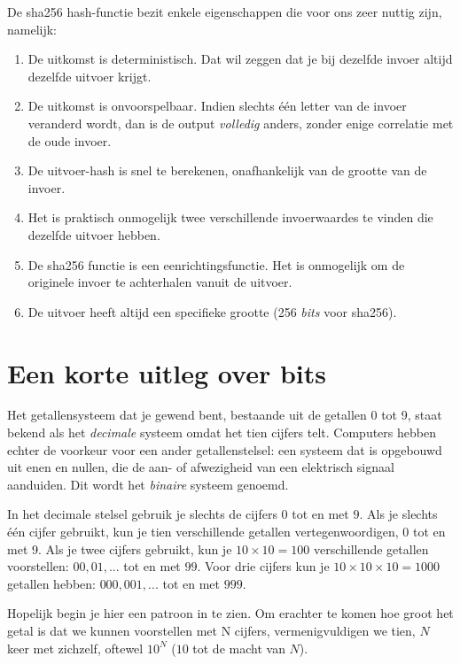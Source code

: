 \clearpage

De sha256 hash-functie bezit enkele eigenschappen die voor ons zeer nuttig zijn, namelijk:



\begin{enumerate}
    \item De uitkomst is deterministisch. Dat wil zeggen dat je bij dezelfde invoer altijd dezelfde uitvoer krijgt.
    \item De uitkomst is onvoorspelbaar. Indien slechts één letter van de invoer veranderd wordt, dan is de output \textit{volledig} anders, zonder enige correlatie met de oude invoer.
    \item De uitvoer-hash is snel te berekenen, onafhankelijk van de grootte van de invoer.
    \item Het is praktisch onmogelijk twee verschillende invoerwaardes te vinden die dezelfde uitvoer hebben.
    \item De sha256 functie is een eenrichtingsfunctie. Het is onmogelijk om de originele invoer te achterhalen vanuit de uitvoer.
    \item De uitvoer heeft altijd een specifieke grootte (256 \textit{bits} voor sha256).
\end{enumerate}

\section{Een korte uitleg over bits}

Het getallensysteem dat je gewend bent, bestaande uit de getallen 0 tot 9, staat bekend als het \textit{decimale} systeem omdat het tien cijfers telt. Computers hebben echter de voorkeur voor een ander getallenstelsel: een systeem dat is opgebouwd uit enen en nullen, die de aan- of afwezigheid van een elektrisch signaal aanduiden. Dit wordt het \textit{binaire} systeem genoemd.

In het decimale stelsel gebruik je slechts de cijfers $0$ tot en met $9$. Als je slechts één cijfer gebruikt, kun je tien verschillende getallen vertegenwoordigen, 0 tot en met 9. Als je twee cijfers gebruikt, kun je $10 \times 10 = 100$ verschillende getallen voorstellen: $00, 01,...$ tot en met $99$. Voor drie cijfers kun je $10 \times 10 \times 10 = 1000$ getallen hebben: $000, 001,...$ tot en met $999$.

Hopelijk begin je hier een patroon in te zien. Om erachter te komen hoe groot het getal is dat we kunnen voorstellen met N cijfers, vermenigvuldigen we tien, $N$ keer met zichzelf, oftewel $10^N$ ($10$ tot de macht van $N$).

